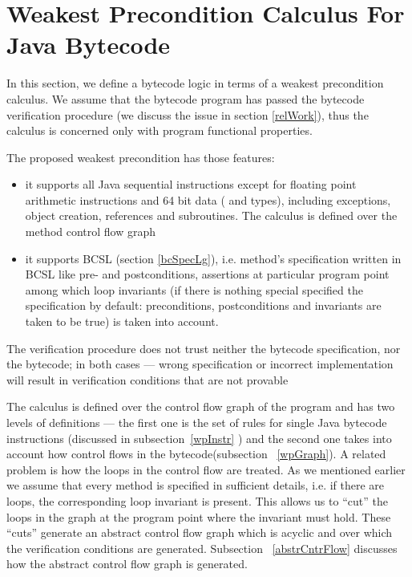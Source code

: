 
\section{Weakest Precondition Calculus For Java Bytecode}\label{wpbc}
In this section, we define a bytecode logic in terms of a weakest precondition calculus.
We assume that the bytecode program has passed the bytecode verification procedure (we discuss the issue in section \ref{relWork}), thus the calculus is concerned only with 
 program functional properties. 

The proposed weakest precondition has those features:
\begin{itemize}
\item it supports all Java sequential instructions except for floating point arithmetic instructions and 64 bit data ( and  types), including 
exceptions, object creation, references and subroutines. The calculus is defined over the method control flow graph

\item it supports BCSL (section \ref{bcSpecLg}), i.e. method's specification written in BCSL like pre- and postconditions, assertions at particular program point among 
which loop invariants (if there is nothing special specified the specification by default: preconditions, postconditions and invariants are taken to be true) is taken into account. %
\end{itemize}
The verification procedure does not trust neither the bytecode specification, nor the bytecode; in both cases --- wrong 
specification or incorrect implementation will result in verification conditions that are not provable 

The calculus is defined over the control flow graph of the program and has two levels of definitions --- the first one is the set of rules for single Java bytecode instructions (discussed in subsection~\ref{wpInstr} ) and the second one takes into account how control
 flows in the bytecode(subsection ~\ref{wpGraph}). A related problem is how the loops in the control flow are treated. 
As we mentioned earlier we assume that every method is specified in sufficient details, i.e. if there are loops, the corresponding 
loop invariant is present. This allows us to ``cut'' the loops in the graph at the program point where the invariant must hold. 
These ``cuts'' generate an abstract control flow graph which is acyclic and over which the verification conditions are generated. Subsection ~\ref{abstrCntrFlow} discusses 
how the abstract control flow graph is generated.

